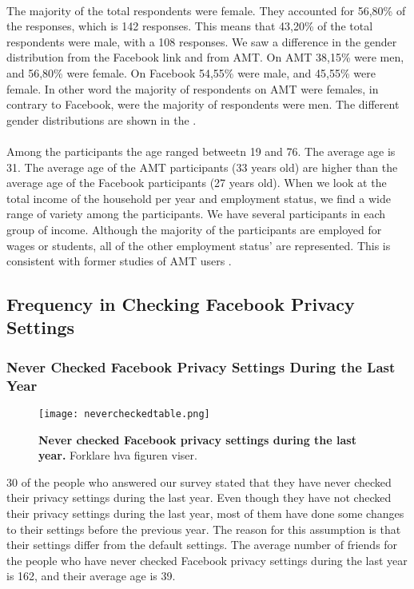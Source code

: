 \paragraph{}
The majority of the total respondents were female. They accounted for 56,80\% of the responses, which is 142 responses. This means that 43,20\% of the total respondents were male, with a 108 responses. We saw a difference in the gender distribution from the Facebook link and from AMT. On AMT 38,15\% were men, and 56,80\% were female. On Facebook 54,55\% were male, and 45,55\% were female. In other word the majority of respondents on AMT were females, in contrary to Facebook, were the majority of respondents were men. The different gender distributions are shown in the .
 
\paragraph{}
Among the participants the age ranged betweetn 19 and 76. The average age is 31. The average age of the AMT participants (33 years old) are higher than the average age of the Facebook participants (27 years old). When we look at the total income of the household per year and employment status, we find a wide range of variety among the participants. We have several participants in each group of income. Although the majority of the participants are employed for wages or students, all of the other employment status' are represented. This is consistent with former studies of AMT users \cite{incentivesAmt}. 


\subsection{Frequency in Checking Facebook Privacy Settings}

\subsubsection{Never Checked Facebook Privacy Settings During the Last Year}

\begin{figure}[h!]
\centering
\texttt{[image: nevercheckedtable.png]}
\caption[Never checked Facebook privacy settings during the last year]{\textbf{Never checked Facebook privacy settings during the last year.} Forklare hva figuren viser.} 
\label{fig:neverchecked}
\end{figure}

30 of the people who answered our survey stated that they have never checked their privacy settings during the last year. Even though they have not checked their privacy settings during the last year, most of them have done some changes to their settings before the previous year. The reason for this assumption is that their settings differ from the default settings.  
The average number of friends for the people who have never checked Facebook privacy settings during the last year is 162, and their average age is 39. 

